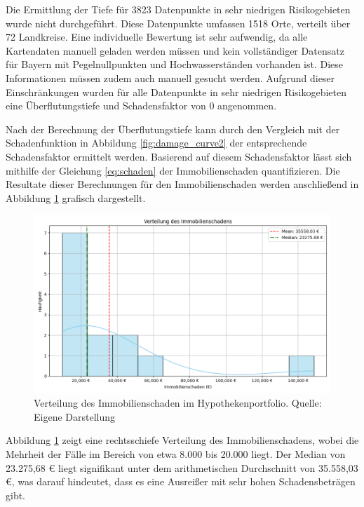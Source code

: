 Die Ermittlung der Tiefe für 3823 Datenpunkte in sehr niedrigen Risikogebieten wurde nicht durchgeführt. Diese Datenpunkte umfassen 1518 Orte, verteilt über 72 Landkreise. Eine individuelle Bewertung ist sehr aufwendig, da alle Kartendaten manuell geladen werden müssen und kein vollständiger Datensatz für Bayern mit Pegelnullpunkten und Hochwasserständen vorhanden ist. Diese Informationen müssen zudem auch manuell gesucht werden. Aufgrund dieser Einschränkungen wurden für alle Datenpunkte in sehr niedrigen Risikogebieten eine Überflutungstiefe und Schadensfaktor von 0 angenommen.

Nach der Berechnung der Überflutungstiefe kann durch den Vergleich mit der Schadenfunktion in Abbildung \ref{fig:damage_curve2} der entsprechende Schadensfaktor ermittelt werden. Basierend auf diesem Schadensfaktor lässt sich mithilfe der Gleichung \ref{eq:schaden} der Immobilienschaden quantifizieren. Die Resultate dieser Berechnungen für den Immobilienschaden werden anschließend in Abbildung \ref{fig:schadenwert} grafisch dargestellt.
\begin{figure}[htbp]
    \centering
    \includegraphics[width=\textwidth]{figures/flutschaden.png}
    \caption{Verteilung des Immobilienschaden im Hypothekenportfolio. Quelle: Eigene Darstellung}
    \label{fig:schadenwert}
\end{figure}
\FloatBarrier
Abbildung \ref{fig:schadenwert} zeigt eine rechtsschiefe Verteilung des Immobilienschadens, wobei die Mehrheit der Fälle im Bereich von etwa 8.000 bis 20.000 liegt. Der Median von 23.275,68 € liegt signifikant unter dem arithmetischen Durchschnitt von 35.558,03 €, was darauf hindeutet, dass es eine Ausreißer mit sehr hohen Schadensbeträgen gibt.


